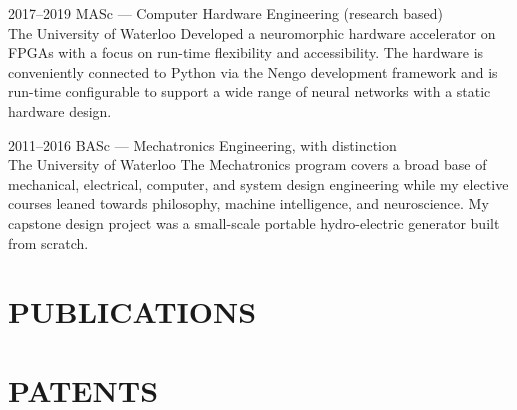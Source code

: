 \documentclass[a4paper,nocolors]{cv-friggeri-ben}
\begin{document}
\begin{entrylist}

\entry
    {2017--2019}
    {MASc {\normalfont --- Computer Hardware Engineering (research based)}}
    {\\The University of Waterloo}
    {Developed a neuromorphic hardware accelerator on FPGAs with a focus on
    run-time flexibility and accessibility. The hardware is conveniently
    connected to Python via the Nengo development framework and is run-time
    configurable to support a wide range of neural networks with a static
    hardware design.}

\entry
    {2011--2016}
    {BASc {\normalfont --- Mechatronics Engineering, with distinction}}
    {\\The University of Waterloo}
    {The Mechatronics program covers a broad base of mechanical, electrical,
    computer, and system design engineering while my elective courses leaned
    towards philosophy, machine intelligence, and neuroscience. My capstone
    design project was a small-scale portable hydro-electric generator built
    from scratch.}

\end{entrylist}



\section{PUBLICATIONS}

{}



\section{PATENTS}






\end{document}
